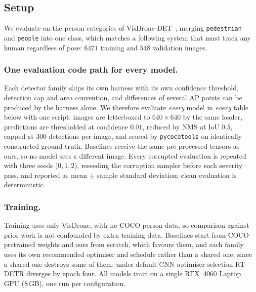 \subsection{Setup}
\label{sec:setup}

We evaluate on the person categories of VisDrone-DET~\cite{zhu2021visdrone}, merging
\texttt{pedestrian} and \texttt{people} into one class, which matches a following system
that must track any human regardless of pose: $6471$ training and $548$ validation
images.

\subsubsection{One evaluation code path for every model.}
Each detector family ships its own harness with its own confidence threshold,
detection cap and area convention, and differences of several AP points can be
produced by the harness alone. We therefore evaluate \emph{every} model in
\emph{every} table below with one script: images are letterboxed to $640\times640$ by the same loader, predictions are
thresholded at confidence $0.01$, reduced by NMS at IoU $0.5$, capped at $300$
detections per image, and scored by \texttt{pycocotools} on identically constructed
ground truth. Baselines receive the same pre-processed tensors as ours, so no model
sees a different image. Every corrupted evaluation is repeated with three seeds
($0,1,2$), reseeding the corruption sampler before each severity pass, and reported as
mean $\pm$ sample standard deviation; clean evaluation is deterministic.

\subsubsection{Training.}
Training uses only VisDrone, with no COCO person data, so comparison against prior
work is not confounded by extra training data. Baselines start from COCO-pretrained
weights and ours from scratch, which favours them, and each family uses its own
recommended optimiser and schedule rather than a shared one, since a shared one
destroys some of them: under default CNN optimiser selection RT-DETR diverges by
epoch four. All models train on a single RTX~4060 Laptop GPU (8\,GB), one run per
configuration.
